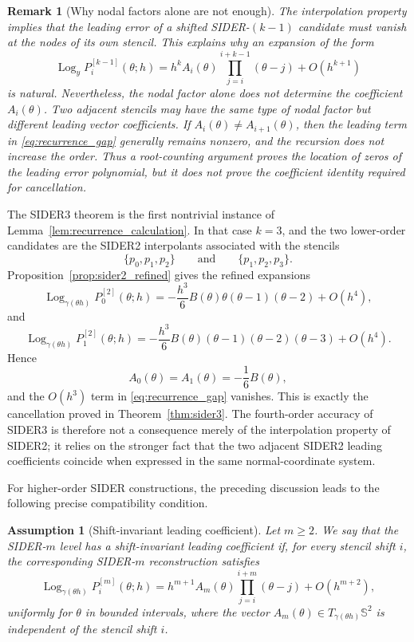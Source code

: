\documentclass[a4paper,11pt]{article}
\newcommand{\bS}{\mathbb{S}}
\newcommand{\Log}{\operatorname{Log}}
\newtheorem{remark}{Remark}
\newtheorem{assump}{Assumption}
\numberwithin{equation}{section}
\begin{document}
\begin{remark}[Why nodal factors alone are not enough]
\label{rem:root_counting_insufficient}
The interpolation property implies that the leading error of a shifted
SIDER-\((k-1)\) candidate must vanish at the nodes of its own stencil.  This
explains why an expansion of the form
\[
\Log_y P_i^{[k-1]}(\theta;h)
=
h^k A_i(\theta)
\prod_{j=i}^{i+k-1}(\theta-j)
+
O(h^{k+1})
\]
is natural.  Nevertheless, the nodal factor alone does not determine the
coefficient \(A_i(\theta)\).  Two adjacent stencils may have the same type of
nodal factor but different leading vector coefficients.  If
\(A_i(\theta)\neq A_{i+1}(\theta)\), then the leading term in
\eqref{eq:recurrence_gap} generally remains nonzero, and the recursion does
not increase the order.  Thus a root-counting argument proves the location of
zeros of the leading error polynomial, but it does not prove the
coefficient identity required for cancellation.
\end{remark}

The SIDER3 theorem is the first nontrivial instance of
Lemma~\ref{lem:recurrence_calculation}.  In that case \(k=3\), and the two
lower-order candidates are the SIDER2 interpolants associated with the stencils
\[
        \{p_0,p_1,p_2\}
        \qquad\text{and}\qquad
        \{p_1,p_2,p_3\}.
\]
Proposition~\ref{prop:sider2_refined} gives the refined expansions
\[
\Log_{\gamma(\theta h)}P_0^{[2]}(\theta;h)
=
-\frac{h^3}{6}B(\theta)
\theta(\theta-1)(\theta-2)
+
O(h^4),
\]
and
\[
\Log_{\gamma(\theta h)}P_1^{[2]}(\theta;h)
=
-\frac{h^3}{6}B(\theta)
(\theta-1)(\theta-2)(\theta-3)
+
O(h^4).
\]
Hence
\[
        A_0(\theta)=A_1(\theta)=-\frac16 B(\theta),
\]
and the \(O(h^3)\) term in \eqref{eq:recurrence_gap} vanishes.  This is
exactly the cancellation proved in Theorem~\ref{thm:sider3}.  The fourth-order
accuracy of SIDER3 is therefore not a consequence merely of the interpolation
property of SIDER2; it relies on the stronger fact that the two adjacent
SIDER2 leading coefficients coincide when expressed in the same
normal-coordinate system.

For higher-order SIDER constructions, the preceding discussion leads to the
following precise compatibility condition.

\begin{assump}[Shift-invariant leading coefficient]
\label{assump:shift_invariant}
Let \(m\geq2\).  We say that the SIDER-\(m\) level has a shift-invariant
leading coefficient if, for every stencil shift \(i\), the corresponding
SIDER-\(m\) reconstruction satisfies
\[
\Log_{\gamma(\theta h)}P_i^{[m]}(\theta;h)
=
h^{m+1}A_m(\theta)
\prod_{j=i}^{i+m}(\theta-j)
+
O(h^{m+2}),
\]
uniformly for \(\theta\) in bounded intervals, where the vector
\(A_m(\theta)\in T_{\gamma(\theta h)}\bS^2\) is independent of the stencil
shift \(i\).
\end{assump}
\end{document}
